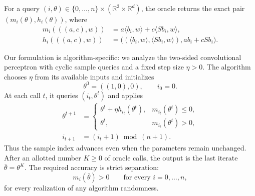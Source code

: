 \documentclass[10pt]{article}
\theoremstyle{definition}
\begin{document}
For a query $(i,\theta)\in\{0,\ldots,n\}\times(\mathbb{R}^2\times\mathbb{R}^d)$, the oracle returns the exact pair $(m_i(\theta),h_i(\theta))$, where
\[
\begin{aligned}
m_i(((a,c),w))
 &=a\langle b_i,w\rangle+c\langle Sb_i,w\rangle,\\
h_i(((a,c),w))
 &=\bigl((\langle b_i,w\rangle,\langle Sb_i,w\rangle),
          ab_i+cSb_i\bigr).
\end{aligned}
\]

Our formulation is algorithm-specific: we analyze the two-sided convolutional perceptron with cyclic sample queries and a fixed step size $\eta>0$. The algorithm chooses $\eta$ from its available inputs and initializes
\[
\theta^0=((1,0),0),\qquad i_0=0.
\]
At each call $t$, it queries $(i_t,\theta^t)$ and applies
\[
\begin{aligned}
\theta^{t+1}
 &=\begin{cases}
 \theta^t+\eta h_{i_t}(\theta^t),&m_{i_t}(\theta^t)\leq0,\\
 \theta^t,&m_{i_t}(\theta^t)>0,
 \end{cases}\\
i_{t+1}&=(i_t+1)\bmod(n+1).
\end{aligned}
\]
Thus the sample index advances even when the parameters remain unchanged. After an allotted number $K\geq0$ of oracle calls, the output is the last iterate $\bar\theta=\theta^K$. The required accuracy is strict separation:
\[
m_i(\bar\theta)>0
\qquad\text{for every }i=0,\ldots,n,
\]
for every realization of any algorithm randomness.
\end{document}
